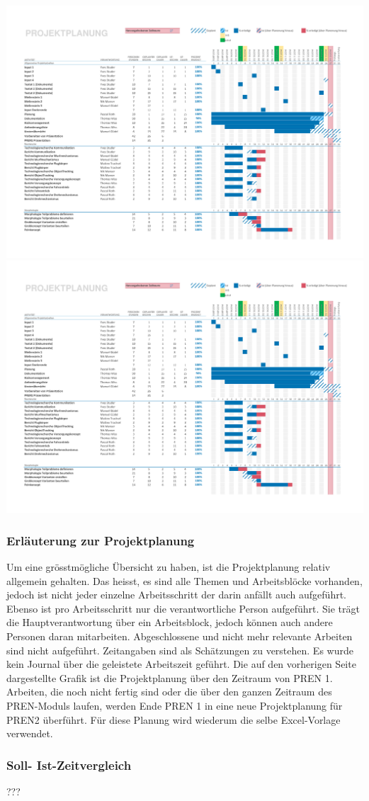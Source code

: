 \begin{landscape}
    \includegraphics[page=1,scale=0.8,clip,trim=15mm 22mm 13mm 18mm] {Enddokumentation/Projektplanung_Management/Bilder/Projekt-Planung_Team32.pdf}
    \newpage
    \includegraphics[page=2,scale=0.8,clip,trim=15mm 100mm 13mm 10mm] {Enddokumentation/Projektplanung_Management/Bilder/Projekt-Planung_Team32.pdf}
    \newpage
\end{landscape}
\subsubsection{Erläuterung zur Projektplanung}
Um eine grösstmögliche Übersicht zu haben, ist die Projektplanung relativ 
allgemein gehalten. Das heisst, es sind alle Themen und Arbeitsblöcke vorhanden, 
jedoch ist nicht jeder einzelne Arbeitsschritt der darin anfällt auch aufgeführt. 
Ebenso ist pro Arbeitsschritt nur die verantwortliche Person aufgeführt. Sie 
trägt die Hauptverantwortung über ein Arbeitsblock, jedoch können auch andere 
Personen daran mitarbeiten. Abgeschlossene und nicht mehr relevante Arbeiten 
sind nicht aufgeführt. Zeitangaben sind als Schätzungen zu verstehen. Es wurde 
kein Journal über die geleistete Arbeitszeit geführt. Die auf den vorherigen 
Seite dargestellte Grafik ist die Projektplanung über den Zeitraum von PREN 1. 
Arbeiten, die noch nicht fertig sind oder die über den ganzen Zeitraum des 
PREN-Moduls laufen, werden Ende PREN 1 in eine neue Projektplanung für PREN2 
überführt. Für diese Planung wird wiederum die selbe Excel-Vorlage verwendet. 

\subsubsection{Soll- Ist-Zeitvergleich}
???